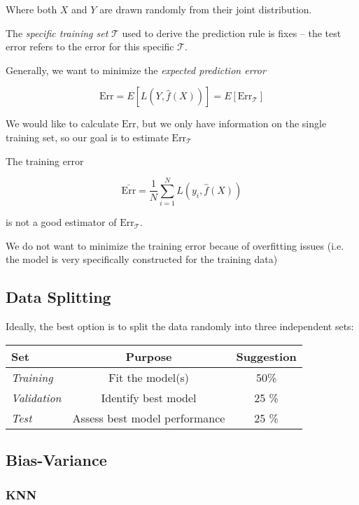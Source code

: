 \documentclass[twoside,twocolumn,10pt]{revtex4-1}
\begin{document}
	Where both $X$ and $Y$ are drawn randomly from their joint distribution.
	
	The \textit{specific training set} $\mathcal{T}$ used to derive the prediction rule is fixes – the test error refers to the error for this specific $\mathcal{T}$.
	
	Generally, we want to minimize the \textit{expected prediction error}
	
	\begin{equation*}
	\text{Err} = E[ L(Y,\hat{f}(X)) ] = E[\text{Err}_\mathcal{T}]
	\end{equation*}
	
	We would like to calculate $\text{Err}$, but we only have information on the single training set, so our goal is to estimate $\text{Err}_\mathcal{T}$
	
	The training error
	
	\begin{equation*}
	\bar{\text{Err}} = \frac{1}{N} \sum_{i=1}^N L(y_i, \hat{f}(X))
	\end{equation*}
	
	is not a good estimator of $\text{Err}_\mathcal{T}$.
	
	We do not want to minimize the training error becaue of overfitting issues (i.e. the model is very specifically constructed for the training data)
	
	\subsection{Data Splitting}
	
	Ideally, the best option is to split the data randomly into three independent sets:
	
	\begin{tabular}{l c c}
	\textbf{Set} & \textbf{Purpose} & \textbf{Suggestion}\\
	\hline
	\textit{Training} & Fit the model(s) & 50\%\\
	\textit{Validation} & Identify best model & 25 \% \\
	\textit{Test} & Assess best model performance & 25 \%
	\end{tabular}
	
	\subsection{Bias-Variance}
	
	\subsubsection{KNN}
	
\end{document}

